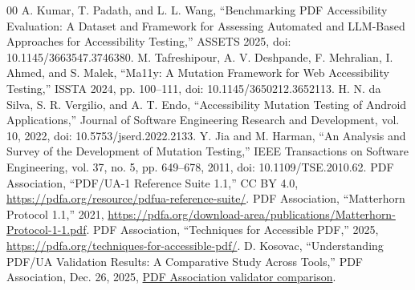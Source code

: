 \documentclass[conference]{IEEEtran}
\begin{document}
\begin{thebibliography}{00}
 A. Kumar, T. Padath, and L. L. Wang, ``Benchmarking PDF Accessibility Evaluation: A Dataset and Framework for Assessing Automated and LLM-Based Approaches for Accessibility Testing,'' ASSETS 2025, doi: 10.1145/3663547.3746380.
 M. Tafreshipour, A. V. Deshpande, F. Mehralian, I. Ahmed, and S. Malek, ``Ma11y: A Mutation Framework for Web Accessibility Testing,'' ISSTA 2024, pp. 100--111, doi: 10.1145/3650212.3652113.
 H. N. da Silva, S. R. Vergilio, and A. T. Endo, ``Accessibility Mutation Testing of Android Applications,'' Journal of Software Engineering Research and Development, vol. 10, 2022, doi: 10.5753/jserd.2022.2133.
 Y. Jia and M. Harman, ``An Analysis and Survey of the Development of Mutation Testing,'' IEEE Transactions on Software Engineering, vol. 37, no. 5, pp. 649--678, 2011, doi: 10.1109/TSE.2010.62.
 PDF Association, ``PDF/UA-1 Reference Suite 1.1,'' CC BY 4.0, \url{https://pdfa.org/resource/pdfua-reference-suite/}.
 PDF Association, ``Matterhorn Protocol 1.1,'' 2021, \url{https://pdfa.org/download-area/publications/Matterhorn-Protocol-1-1.pdf}.
 PDF Association, ``Techniques for Accessible PDF,'' 2025, \url{https://pdfa.org/techniques-for-accessible-pdf/}.
 D. Kosovac, ``Understanding PDF/UA Validation Results: A Comparative Study Across Tools,'' PDF Association, Dec. 26, 2025, \href{https://pdfa.org/understanding-pdfua-validation-results-a-comparative-study-across-tools/}{PDF Association validator comparison}.
\end{thebibliography}

\tagstructend
\end{document}
